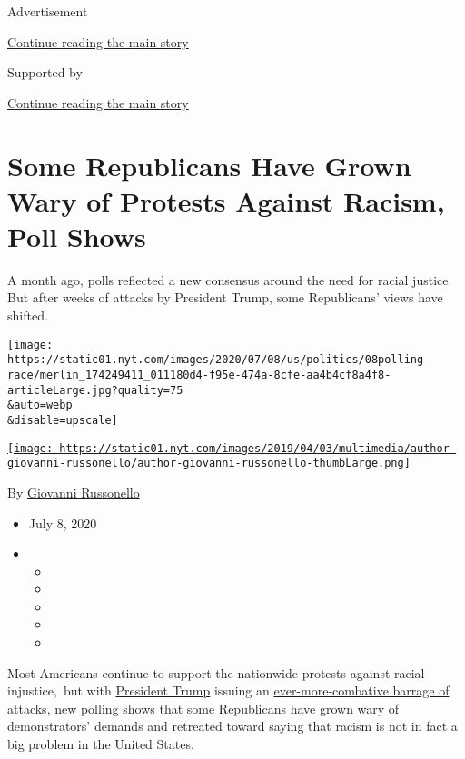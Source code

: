 Advertisement

\protect\hyperlink{after-top}{Continue reading the main story}

Supported by

\protect\hyperlink{after-sponsor}{Continue reading the main story}

\hypertarget{some-republicans-have-grown-wary-of-protests-against-racism-poll-shows}{%
\section{Some Republicans Have Grown Wary of Protests Against Racism,
Poll
Shows}\label{some-republicans-have-grown-wary-of-protests-against-racism-poll-shows}}

A month ago, polls reflected a new consensus around the need for racial
justice. But after weeks of attacks by President Trump, some
Republicans' views have shifted.

\texttt{[image: https://static01.nyt.com/images/2020/07/08/us/politics/08polling-race/merlin\_174249411\_011180d4-f95e-474a-8cfe-aa4b4cf8a4f8-articleLarge.jpg?quality=75\\\&auto=webp\\\&disable=upscale]}

\href{https://www.nytimes.com/by/giovanni-russonello}{\texttt{[image: https://static01.nyt.com/images/2019/04/03/multimedia/author-giovanni-russonello/author-giovanni-russonello-thumbLarge.png]}}

By \href{https://www.nytimes.com/by/giovanni-russonello}{Giovanni
Russonello}

\begin{itemize}
\item
  July 8, 2020
\item
  \begin{itemize}
  \item
  \item
  \item
  \item
  \item
  \end{itemize}
\end{itemize}

Most Americans continue to support the nationwide protests against
racial injustice,~but with
\href{https://www.nytimes.com/interactive/2020/us/elections/donald-trump.html}{President
Trump} issuing an
\href{https://www.nytimes.com/2020/07/06/us/politics/trump-bubba-wallace-nascar.html}{ever-more-combative
barrage of attacks}, new polling shows that some Republicans have grown
wary of demonstrators' demands and retreated toward saying that racism
is not in fact a big problem in the United States.

